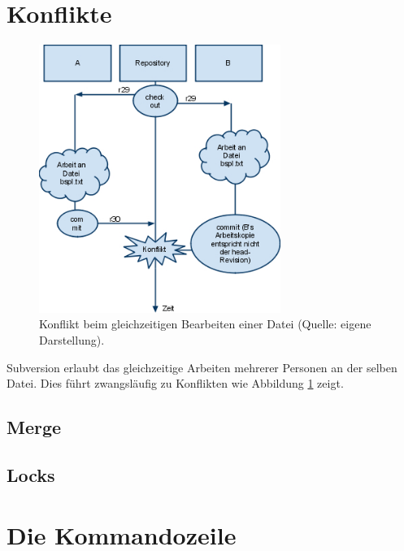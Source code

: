 \section{Konflikte}
\begin{figure}%
	\centering
	\includegraphics[width=0.7\textwidth]{konflikt}
	\caption{Konflikt beim gleichzeitigen Bearbeiten einer Datei (Quelle: eigene Darstellung).}
	\label{fig:konflikt}
\end{figure}
Subversion erlaubt das gleichzeitige Arbeiten mehrerer Personen an der selben Datei. Dies führt zwangsläufig zu Konflikten wie Abbildung \ref{fig:konflikt} zeigt.
\subsection{Merge}
\subsection{Locks}

\section{Die Kommandozeile}
